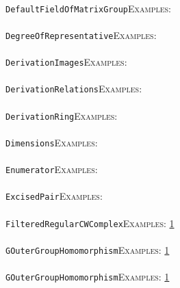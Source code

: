 \documentclass[a4paper,11pt]{report}
\begin{document}
{{ \\
 \texttt{DefaultFieldOfMatrixGroup}{\nobreakspace}{\nobreakspace}{\nobreakspace}{\nobreakspace}\textsc{Examples:} \\
 \\
 \texttt{DegreeOfRepresentative}{\nobreakspace}{\nobreakspace}{\nobreakspace}{\nobreakspace}\textsc{Examples:} \\
 \\
 \texttt{DerivationImages}{\nobreakspace}{\nobreakspace}{\nobreakspace}{\nobreakspace}\textsc{Examples:} \\
 \\
 \texttt{DerivationRelations}{\nobreakspace}{\nobreakspace}{\nobreakspace}{\nobreakspace}\textsc{Examples:} \\
 \\
 \texttt{DerivationRing}{\nobreakspace}{\nobreakspace}{\nobreakspace}{\nobreakspace}\textsc{Examples:} \\
 \\
 \texttt{Dimensions}{\nobreakspace}{\nobreakspace}{\nobreakspace}{\nobreakspace}\textsc{Examples:} \\
 \\
 \texttt{Enumerator}{\nobreakspace}{\nobreakspace}{\nobreakspace}{\nobreakspace}\textsc{Examples:} \\
 \\
 \texttt{ExcisedPair}{\nobreakspace}{\nobreakspace}{\nobreakspace}{\nobreakspace}\textsc{Examples:} \\
 \\
 \texttt{FilteredRegularCWComplex}{\nobreakspace}{\nobreakspace}{\nobreakspace}{\nobreakspace}\textsc{Examples:} \href{tutorial/chap4.html} {1}{\nobreakspace} \\
 \\
 \texttt{GOuterGroupHomomorphism}{\nobreakspace}{\nobreakspace}{\nobreakspace}{\nobreakspace}\textsc{Examples:} \href{../www/SideLinks/About/aboutCoefficientSequence.html} {1}{\nobreakspace} \\
 \\
 \texttt{GOuterGroupHomomorphism}{\nobreakspace}{\nobreakspace}{\nobreakspace}{\nobreakspace}\textsc{Examples:} \href{../www/SideLinks/About/aboutCoefficientSequence.html} {1}{\nobreakspace} \\
 \\
}}
\end{document}
